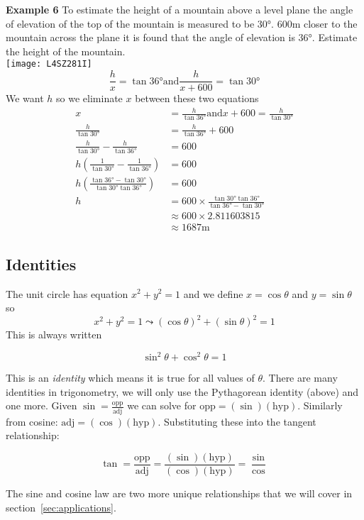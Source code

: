 \textbf{Example 6}
To estimate the height of a mountain above a level plane the angle of elevation of the top of the mountain is measured to be $\ang{30} $. $600 \mbox{m}$ closer to the mountain across the plane it is found that the angle of elevation is $\ang{36} $. Estimate the height of the mountain. \\
\texttt{[image: L4SZ281I]}
\begin{equation*}\frac{h}{x} =\tan  \ang{36} \text{and}\frac{h}{x +600} =\tan  \ang{30} 
\end{equation*}
We want $h$ so we eliminate $x$ between these two equations
\begin{align*}x &  =  \frac{h}{\tan  \ang{36} }\text{and}x +600 =\frac{h}{\tan  \ang{30} } \\
\frac{h}{\tan  \ang{30} } &  =  \frac{h}{\tan  \ang{36} } +600 \\
\frac{h}{\tan  \ang{30} } -\frac{h}{\tan  \ang{36} } &  =  600 \\
h \left (\frac{1}{\tan  \ang{30} } -\frac{1}{\tan  \ang{36} }\right ) &  =  600 \\
h \genfrac{(}{)}{}{}{\tan  \ang{36}  -\tan  \ang{30} }{\tan  \ang{30}  \tan  \ang{36} } &  =  600 \\
h &  =  600 \times \frac{\tan  \ang{30}  \tan  \ang{36} }{\tan  \ang{36}  -\tan  \ang{30} } \\
 &  \approx   600 \times 2.811603815 \\
 &  \approx   1687 \mbox{m}\end{align*}

\subsection*{Identities}\label{sec:identities}
The unit circle has equation $x^{2} +y^{2} =1$ and we define $x =\cos  \theta$ and $y =\sin  \theta$ so
\begin{equation*}x^{2} +y^{2} =1 \leadsto \left (\cos  \theta\right )^{2} +\left (\sin  \theta\right )^{2} =1
\end{equation*}
This is always written
\begin{tcolorbox}\[\sin ^{2} \theta +\cos ^{2} \theta =1\]
\end{tcolorbox}
This is an \emph{identity} which means it is true for all values of $\theta$. There are many identities in trigonometry, we will only use the Pythagorean identity (above) and one more.
Given $\sin =\frac{\text{opp}}{\text{adj}}$ we can solve for $\text{opp}=(\sin)(\text{hyp})$. Similarly from cosine:  $\text{adj}=(\cos)(\text{hyp})$. Substituting these into the tangent relationship:
\begin{tcolorbox}\[\tan=\frac{\text{opp}}{\text{adj}}=\frac{(\sin)(\text{hyp})}{(\cos)(\text{hyp})}=\frac{\sin}{\cos}\]
\end{tcolorbox}
The sine and cosine law are two more unique relationships that we will cover in section~\ref{sec:applications}.

